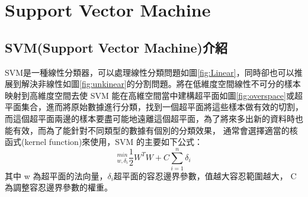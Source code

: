 \chapter{Support Vector Machine }
\label{chapter:SVM}
\section{SVM(Support Vector Machine)介紹}
SVM是一種線性分類器，可以處理線性分類問題如圖\ref{fig:Linear}，同時卻也可以推展到解決非線性如圖\ref{fig:unkinear}的分割問題。將在低維度空間線性不可分的樣本映射到高維度空間去使 SVM 能在高維空間當中建構超平面如圖\ref{fig:overspace}或超平面集合，進而將原始數據進行分類，找到一個超平面將這些樣本做有效的切割，而這個超平面兩邊的樣本要盡可能地遠離這個超平面，為了將來多出新的資料時也能有效，而為了能針對不同類型的數據有個別的分類效果，
通常會選擇適當的核函式(kernel function)來使用，SVM 的主要如下公式：
\begin{equation}
	\label{equ:SVM}
	_{w,\delta_i}^{min}\frac{1}{2}W^TW+C\sum_{i=1}^{n}\delta_i
\end{equation}
其中 w 為超平面的法向量，$\delta_i$超平面的容忍邊界參數，值越大容忍範圍越大，
C 為調整容忍邊界參數的權重。




